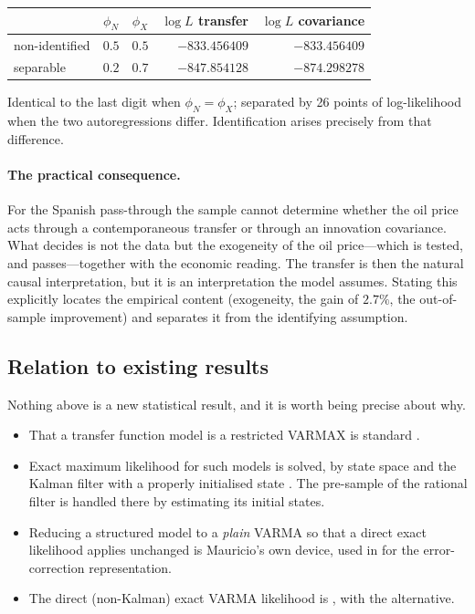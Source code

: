 \documentclass[11pt,a4paper]{article}
\theoremstyle{plain}
\theoremstyle{remark}
\begin{document}
\begin{center}
\begin{tabular}{lccrr}
\toprule
 & $\phi_N$ & $\phi_X$ & $\log L$ transfer & $\log L$ covariance \\
\midrule
non-identified & $0.5$ & $0.5$ & $-833.456409$ & $-833.456409$ \\
separable      & $0.2$ & $0.7$ & $-847.854128$ & $-874.298278$ \\
\bottomrule
\end{tabular}
\end{center}

Identical to the last digit when $\phi_N=\phi_X$; separated by 26 points of
log-likelihood when the two autoregressions differ. Identification arises precisely
from that difference.

\paragraph{The practical consequence.} For the Spanish pass-through the sample
cannot determine whether the oil price acts through a contemporaneous transfer or
through an innovation covariance. What decides is not the data but the exogeneity of
the oil price---which is tested, and passes---together with the economic reading.
The transfer is then the natural causal interpretation, but it is an interpretation
the model assumes. Stating this explicitly locates the empirical content
(exogeneity, the gain of $2.7\%$, the out-of-sample improvement) and separates it
from the identifying assumption.

\subsection{Relation to existing results}
\label{sec:novelty}

Nothing above is a new statistical result, and it is worth being precise about why.

\begin{itemize}
\item That a transfer function model is a restricted VARMAX is standard
  \cite{lutkepohl2005, reinsel1997, gomez2019}.
\item Exact maximum likelihood for such models is solved, by state space and the
  Kalman filter with a properly initialised state \cite{gomez2019, harvey1989}. The
  pre-sample of the rational filter is handled there by estimating its initial
  states.
\item Reducing a structured model to a \emph{plain} VARMA so that a direct exact
  likelihood applies unchanged is Mauricio's own device, used in \cite{mauricio2006}
  for the error-correction representation.
\item The direct (non-Kalman) exact VARMA likelihood is
  \cite{mauricio1995,mauricio1997,mauricio2002}, with \cite{shea1989} the
  alternative.
\end{itemize}
\end{document}
